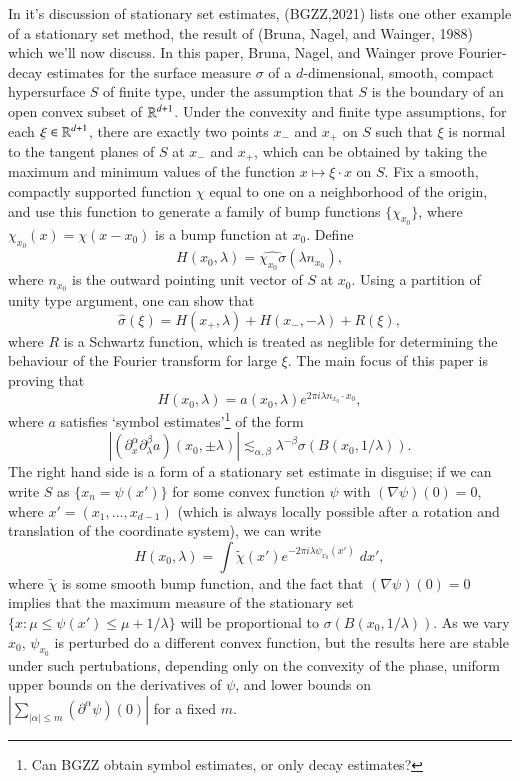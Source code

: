 	In it's discussion of stationary set estimates, (BGZZ,2021) lists one other example of a stationary set method, the result of (Bruna, Nagel, and Wainger, 1988) which we'll now discuss. In this paper, Bruna, Nagel, and Wainger prove Fourier-decay estimates for the surface measure $\sigma$ of a $d$-dimensional, smooth, compact hypersurface $S$ of finite type, under the assumption that $S$ is the boundary of an open convex subset of $\operatorname{\mathbb{R}}^{d+1}$. Under the convexity and finite type assumptions, for each $\xi \in \operatorname{\mathbb{R}}^{d+1}$, there are exactly two points $x_-$ and $x_+$ on $S$ such that $\xi$ is normal to the tangent planes of $S$ at $x_-$ and $x_+$, which can be obtained by taking the maximum and minimum values of the function $x \mapsto \xi \cdot x$ on $S$. Fix a smooth, compactly supported function $\chi$ equal to one on a neighborhood of the origin, and use this function to generate a family of bump functions $\{ \chi_{x_0} \}$, where $\chi_{x_0}(x) = \chi(x - x_0)$ is a bump function at $x_0$. Define
	\[ H(x_0, \lambda) = \widehat{\chi_{x_0} \sigma}(\lambda n_{x_0}), \]
	where $n_{x_0}$ is the outward pointing unit vector of $S$ at $x_0$. Using a partition of unity type argument, one can show that
	\[ \widehat{\sigma}(\xi) = H(x_+, \lambda) + H(x_-, - \lambda) + R(\xi), \]
	where $R$ is a Schwartz function, which is treated as neglible for determining the behaviour of the Fourier transform for large $\xi$. The main focus of this paper is proving that
	\[ H(x_0, \lambda) = a(x_0,\lambda) e^{2 \pi i \lambda n_{x_0} \cdot x_0}, \]
	where $a$ satisfies `symbol estimates'\footnote{Can BGZZ obtain symbol estimates, or only decay estimates?} of the form
	\[ \left| (\partial^\alpha_x \partial^\beta_\lambda a)(x_0, \pm \lambda)\right| \lesssim_{\alpha,\beta} \lambda^{-\beta} \sigma\left( B \left(x_0, 1/\lambda \right) \right). \]
	The right hand side is a form of a stationary set estimate in disguise; if we can write $S$ as $\{ x_n = \psi(x') \}$ for some convex function $\psi$ with $(\nabla \psi)(0) = 0$, where $x' = (x_1,\dots,x_{d-1})$ (which is always locally possible after a rotation and translation of the coordinate system), we can write
	\[ H(x_0,\lambda) = \int \tilde{\chi}(x') e^{-2 \pi i \lambda \psi_{x_0}(x')}\; dx', \]
	where $\tilde{\chi}$ is some smooth bump function, and the fact that $(\nabla \psi)(0) = 0$ implies that the maximum measure of the stationary set $\{ x : \mu \leq \psi(x') \leq \mu + 1/\lambda \}$ will be proportional to $\sigma \left( B(x_0,1/\lambda) \right)$. As we vary $x_0$, $\psi_{x_0}$ is perturbed do a different convex function, but the results here are stable under such pertubations, depending only on the convexity of the phase, uniform upper bounds on the derivatives of $\psi$, and lower bounds on $|\sum_{|\alpha| \leq m} (\partial^\alpha \psi)(0)|$ for a fixed $m$.

